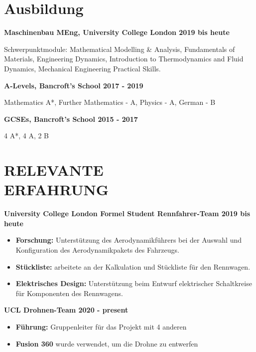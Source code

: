 \documentclass[margin, 10pt]{res} %
\begin{document}
\begin{resume}

 
\section{Ausbildung}  

\textbf{Maschinenbau MEng, University College London \hfill 2019 bis heute}

Schwerpunktmodule: Mathematical Modelling \& Analysis, Fundamentals of Materials, 
Engineering Dynamics, Introduction to Thermodynamics and Fluid Dynamics,
Mechanical Engineering Practical Skills.

\textbf{A-Levels, Bancroft's School \hfill 2017 - 2019}

Mathematics A*, Further Mathematics - A, Physics - A, German - B

\textbf{GCSEs, Bancroft's School
\hfill 2015 - 2017}

4 A*, 4 A, 2 B


\section{RELEVANTE \\ ERFAHRUNG} 

\textbf{University College London Formel Student Rennfahrer-Team \hfill 2019 bis heute}
\\
\begin{itemize}
  \item \textbf{Forschung:} Unterstützung des Aerodynamikführers bei der Auswahl und Konfiguration des Aerodynamikpakets des Fahrzeugs.
  \item \textbf{Stückliste:} arbeitete an der Kalkulation und Stückliste für den Rennwagen.
  \item \textbf{Elektrisches Design:} Unterstützung beim Entwurf elektrischer Schaltkreise für Komponenten des Rennwagens.
\end{itemize}

\textbf{UCL Drohnen-Team \hfill 2020 - present}
\\
\begin{itemize}
  \item \textbf{Führung:} Gruppenleiter für das Projekt mit 4 anderen
  \item \textbf{Fusion 360} wurde verwendet, um die Drohne zu entwerfen
\end{itemize}



\end{resume}
\end{document}
